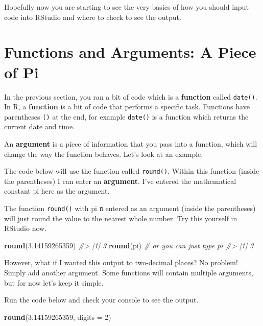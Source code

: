 \documentclass[
]{book}
\newenvironment{Shaded}{\begin{snugshade}}{\end{snugshade}}
\newcommand{\AttributeTok}[1]{\textcolor[rgb]{0.13,0.29,0.53}{#1}}
\newcommand{\CommentTok}[1]{\textcolor[rgb]{0.56,0.35,0.01}{\textit{#1}}}
\newcommand{\DecValTok}[1]{\textcolor[rgb]{0.00,0.00,0.81}{#1}}
\newcommand{\FloatTok}[1]{\textcolor[rgb]{0.00,0.00,0.81}{#1}}
\newcommand{\FunctionTok}[1]{\textcolor[rgb]{0.13,0.29,0.53}{\textbf{#1}}}
\newcommand{\NormalTok}[1]{#1}
\let\oldsection\section
\renewcommand{\section}{\needspace{5\baselineskip}\oldsection}
\begin{document}
Hopefully now you are starting to see the very basics of how you should input code into RStudio and where to check to see the output.

\section{Functions and Arguments: A Piece of Pi}\label{functions-and-arguments-a-piece-of-pi}

In the previous section, you ran a bit of code which is a \textbf{function} called \texttt{date()}. In R, a \textbf{function} is a bit of code that performs a specific task. Functions have parentheses \texttt{()} at the end, for example \texttt{date()} is a function which returns the current date and time.

An \textbf{argument} is a piece of information that you pass into a function, which will change the way the function behaves. Let's look at an example.

The code below will use the function called \texttt{round()}. Within this function (inside the parentheses) I can enter an \textbf{argument}. I've entered the mathematical constant pi here as the argument.

The function \texttt{round()} with pi \texttt{π} entered as an argument (inside the parentheses) will just round the value to the nearest whole number. Try this yourself in RStudio now.

\begin{Shaded}
\begin{Highlighting}[]
\FunctionTok{round}\NormalTok{(}\FloatTok{3.14159265359}\NormalTok{)}
\CommentTok{\#\textgreater{} [1] 3}
\FunctionTok{round}\NormalTok{(pi) }\CommentTok{\# or you can just type \textasciigrave{}pi\textasciigrave{}}
\CommentTok{\#\textgreater{} [1] 3}
\end{Highlighting}
\end{Shaded}

However, what if I wanted this output to two-decimal places? No problem! Simply add another argument. Some functions will contain multiple arguments, but for now let's keep it simple.

Run the code below and check your console to see the output.

\begin{Shaded}
\begin{Highlighting}[]
\FunctionTok{round}\NormalTok{(}\FloatTok{3.14159265359}\NormalTok{, }\AttributeTok{digits =} \DecValTok{2}\NormalTok{)}
\end{Highlighting}
\end{Shaded}
\end{document}
